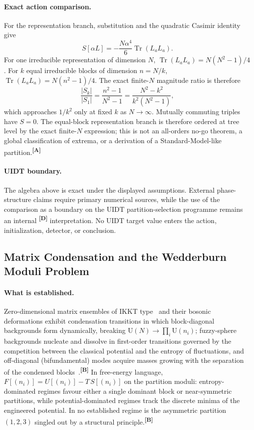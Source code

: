 \documentclass[12pt,a4paper,twoside]{article}
\theoremstyle{plain}
\theoremstyle{definition}
\theoremstyle{remark}
\newcommand{\catmark}[1]{\textsuperscript{\textsf{\textbf{[#1]}}}}
\begin{document}
\paragraph{Exact action comparison.}
For the representation branch, substitution and the quadratic Casimir
identity give
\begin{equation}
\label{eq:ymcs-classical-value}
S[\alpha L]= -\frac{N\alpha^4}{6}\operatorname{Tr}(L_aL_a).
\end{equation}
For one irreducible representation of dimension $N$,
\(
\operatorname{Tr}(L_aL_a)=N(N^2-1)/4
\).
For $k$ equal irreducible blocks of dimension $n=N/k$,
\(
\operatorname{Tr}(L_aL_a)=N(n^2-1)/4
\).
The exact finite-$N$ magnitude ratio is therefore
\begin{equation}
\label{eq:ymcs-equal-block-ratio}
\frac{|S_k|}{|S_1|}
=\frac{n^2-1}{N^2-1}
=\frac{N^2-k^2}{k^2(N^2-1)},
\end{equation}
which approaches $1/k^2$ only at fixed $k$ as $N\to\infty$. Mutually
commuting triples have $S=0$. The equal-block representation branch is
therefore ordered at tree level by the exact finite-$N$ expression; this
is not an all-orders no-go theorem, a global classification of extrema,
or a derivation of a Standard-Model-like partition.\catmark{A}

\paragraph{UIDT boundary.}
The algebra above is exact under the displayed assumptions. External
phase-structure claims require primary numerical sources, while the use
of the comparison as a boundary on the UIDT partition-selection
programme remains an internal \catmark{D} interpretation. No UIDT target
value enters the action, initialization, detector, or conclusion.

\subsection{Matrix Condensation and the Wedderburn Moduli Problem}
\label{subsec:attractor-condensation}

\paragraph{What is established.}
Zero-dimensional matrix ensembles of IKKT type~\cite{ikkt1997} and their
bosonic deformations exhibit condensation transitions in which
block-diagonal backgrounds form dynamically, breaking
$\mathrm{U}(N)\to\prod_i\mathrm{U}(n_i)$; fuzzy-sphere backgrounds
nucleate and dissolve in first-order transitions governed by the
competition between the classical potential and the entropy of
fluctuations, and off-diagonal (bifundamental) modes acquire masses
growing with the separation of the condensed
blocks~\cite{azuma2004,grosse2005,steinacker2010}.\catmark{B} In
free-energy language, $F[(n_i)] = U[(n_i)] - T\,S[(n_i)]$ on the
partition moduli: entropy-dominated regimes favour either a single
dominant block or near-symmetric partitions, while potential-dominated
regimes track the discrete minima of the engineered potential. In no
established regime is the asymmetric partition $(1,2,3)$ singled out by a
structural principle.\catmark{B}
\end{document}
